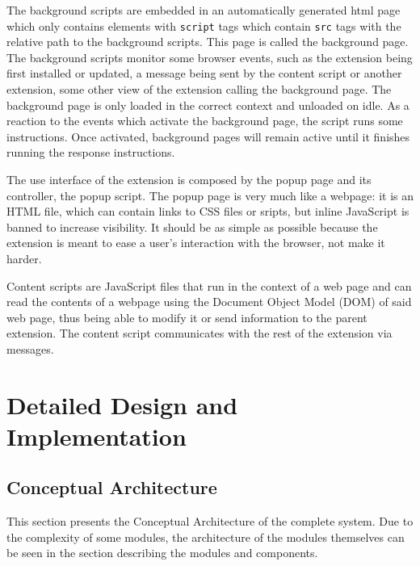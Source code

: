\documentclass[12pt,a4paper,twoside]{report}
\begin{document}
The background scripts are embedded in an automatically generated html page which only contains elements with \lstinline$script$ tags which contain \lstinline$src$ tags with the relative path to the background scripts. This page is called the background page. The background scripts monitor some browser events, such as the extension being first installed or updated, a message being sent by the content script or another extension, some other view of the extension calling the background page. The background page is only loaded in the correct context and unloaded on idle. As a reaction to the events which activate the background page, the script runs some instructions. Once activated, background pages will remain active until it finishes running the response instructions.

The use interface of the extension is composed by the popup page and its controller, the popup script. The popup page is very much like a webpage: it is an HTML file, which can contain links to CSS files or sripts, but inline JavaScript is banned to increase visibility. It should be as simple as possible because the extension is meant to ease a user's interaction with the browser, not make it harder.

Content scripts are JavaScript files that run in the context of a web page and can read the contents of a webpage using the Document Object Model (DOM) of said web page, thus being able to modify it or send information to the parent extension. The content script communicates with the rest of the extension via messages.


\chapter{Detailed Design and Implementation}

\section{Conceptual Architecture}

This section presents the Conceptual Architecture of the complete system. Due to the complexity of some modules, the architecture of the modules themselves can be seen in the section describing the modules and components.
\end{document}
